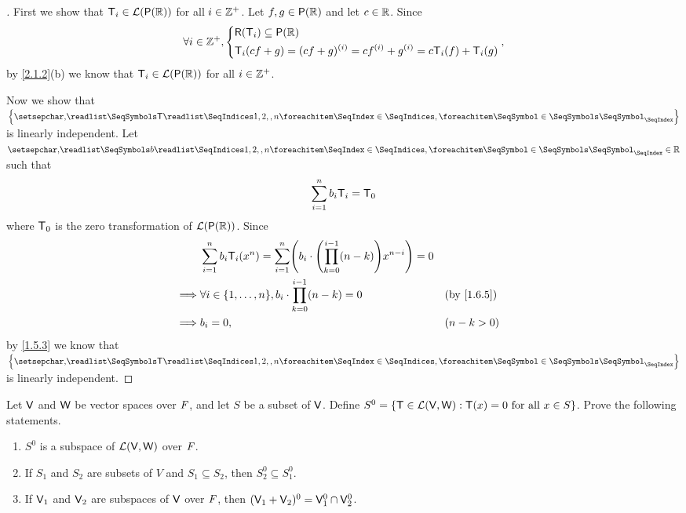 \begin{proof}[]
  First we show that \(\T_i \in \ls(\ps{\R})\) for all \(i \in \mathbb{Z}^+\).
  Let \(f, g \in \ps{\R}\) and let \(c \in \mathbb{R}\).
  Since
  \[
    \forall i \in \Z^+, \begin{dcases}
      \rg{\T_i} \subseteq \ps{\R} \\
      \T_i(cf + g) = (cf + g)^{(i)} = c f^{(i)} + g^{(i)} = c \T_i(f) + \T_i(g)
    \end{dcases},
  \]
  by \cref{2.1.2}(b) we know that \(\T_i \in \ls(\ps{\R})\) for all \(i \in \mathbb{Z}^+\).

  Now we show that \(\set{\seq{\T}{1,2,,n}}\) is linearly independent.
  Let \(\seq{b}{1,2,,n} \in \R\) such that
  \[
    \sum_{i = 1}^n b_i \mathsf{T}_i = \mathsf{T}_0
  \]
  where \(\mathsf{T}_0\) is the zero transformation of \(\ls(\ps{\R})\).
  Since
  \begin{align*}
             & \sum_{i = 1}^n b_i \T_i(x^n) = \sum_{i = 1}^n \pa{b_i \cdot \pa{\prod_{k = 0}^{i - 1} (n - k)} x^{n - i}} = 0                               \\
    \implies & \forall i \in \set{1, \dots, n}, b_i \cdot \prod_{k = 0}^{i - 1} (n - k) = 0                                  &  & \text{(by \cref{1.6.5})} \\
    \implies & b_i = 0,                                                                                                      &  & (n - k > 0)
  \end{align*}
  by \cref{1.5.3} we know that \(\set{\seq{\T}{1,2,,n}}\) is linearly independent.
\end{proof}

\begin{ex}\label{ex:2.2.15}
  Let \(\mathsf{V}\) and \(\mathsf{W}\) be vector spaces over \(\mathit{F}\), and let \(S\) be a subset of \(\mathsf{V}\).
  Define \(S^0 = \left\lbrace\mathsf{T} \in \mathcal{L}(\mathsf{V}, \mathsf{W}) : \mathsf{T}(x) = 0 \text{ for all } x \in S\right\rbrace\).
  Prove the following statements.
  \begin{enumerate}
    \item \(S^0\) is a subspace of \(\mathcal{L}(\mathsf{V}, \mathsf{W})\) over \(\mathit{F}\).
    \item If \(S_1\) and \(S_2\) are subsets of \(V\) and \(S_1 \subseteq S_2\), then \(S_2^0 \subseteq S_1^0\).
    \item If \(\mathsf{V}_1\) and \(\mathsf{V}_2\) are subspaces of \(\mathsf{V}\) over \(\mathit{F}\), then \((\mathsf{V}_1 + \mathsf{V}_2)^0 = \mathsf{V}_1^0 \cap \mathsf{V}_2^0\).
  \end{enumerate}
\end{ex}

